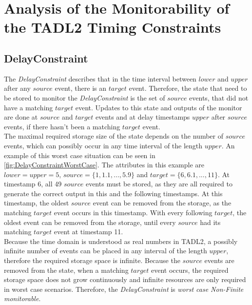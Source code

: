 \chapter{Analysis of the Monitorability of the TADL2 Timing Constraints}
\label{chapter-TADL2}

\section{DelayConstraint}
	\label{monitorability_DelayConstraint}
	The \emph{DelayConstraint} describes that in the time interval between $lower$ and $upper$ after any $source$ event, there is an $target$ event. Therefore, the state that need to be stored to monitor the \emph{DelayConstraint} is the set of $source$ events, that did not have a matching $target$ event. Updates to this state and outputs of the monitor are done at $source$ and $target$ events and at delay timestamps $upper$ after $source$ events, if there hasn't been a matching $target$ event.\\
	The maximal required storage size of the state depends on the number of $source$ events, which can possibly occur in any time interval of the length $upper$. An example of this worst case situation can be seen in \ref{fig:DelayConstraintWorstCase}. The attributes in this example are $lower=upper=5$, $source=\{1, 1.1, ..., 5.9\}$ and $target=\{6, 6.1, ..., 11\}$. At timestamp 6, all 49 $source$ events must be stored, as they are all required to generate the correct output in this and the following timestamps. At this timestamp, the oldest $source$ event can be removed from the storage, as the matching $target$ event occurs in this timestamp. With every following $target$, the oldest event can be removed from the storage, until every $source$ had its matching $target$ event at timestamp 11.\\
	Because the time domain is understood as real numbers in TADL2, a possibly infinite number of events can be placed in any interval of the length $upper$, therefore the required storage space is infinite. Because the $source$ events are removed from the state, when a matching $target$ event occurs, the required storage space does not grow continuously and infinite resources are only required in worst case scenarios. Therefore, the \emph{DelayConstraint} is \emph{worst case Non-Finite monitorable}.	
